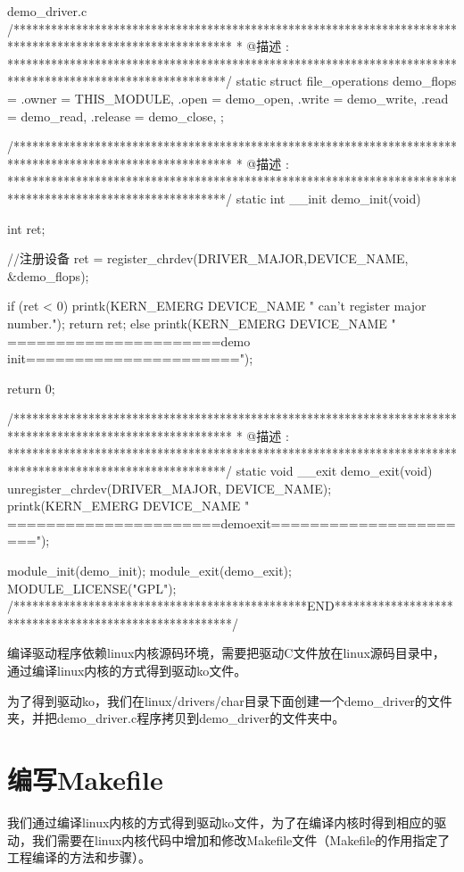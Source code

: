 \documentclass[lang=cn,newtx,10pt,scheme=chinese]{elegantbook}
\begin{document}
\begin{mycode}{demo\_driver.c}
/***********************************************************************************************************
* @描述	:  
***********************************************************************************************************/
static struct file_operations demo_flops = 
{
	.owner  =   THIS_MODULE,
	.open   =   demo_open,     
	.write  =   demo_write,
	.read 	=  	demo_read,
	.release =  demo_close,
};

/***********************************************************************************************************
* @描述	:  
***********************************************************************************************************/
static int __init demo_init(void)
{
    int ret;
 		
	//注册设备
    ret = register_chrdev(DRIVER_MAJOR,DEVICE_NAME, &demo_flops);

    if (ret < 0) 
	{
      printk(KERN_EMERG DEVICE_NAME " can't register major number.\n");
      return ret;
    }
	else
	{
		printk(KERN_EMERG DEVICE_NAME " ======================demo init======================\n");
	}

    return 0;
}
/***********************************************************************************************************
* @描述	:  
***********************************************************************************************************/
static void __exit demo_exit(void)
{
    unregister_chrdev(DRIVER_MAJOR, DEVICE_NAME);
    printk(KERN_EMERG DEVICE_NAME " ======================demoexit======================\n");
}


module_init(demo_init);
module_exit(demo_exit);
MODULE_LICENSE("GPL");
/***********************************************END*******************************************************/
\end{mycode}

编译驱动程序依赖linux内核源码环境，需要把驱动C文件放在linux源码目录中，通过编译linux内核的方式得到驱动ko文件。

为了得到驱动ko，我们在linux/drivers/char目录下面创建一个demo\_driver的文件夹，并把demo\_driver.c程序拷贝到demo\_driver的文件夹中。

\section{编写Makefile}

我们通过编译linux内核的方式得到驱动ko文件，为了在编译内核时得到相应的驱动，我们需要在linux内核代码中增加和修改Makefile文件（Makefile的作用指定了工程编译的方法和步骤）。
\end{document}
